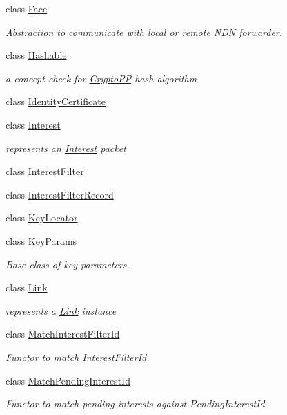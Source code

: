 \begin{DoxyCompactItemize}
class \hyperlink{classndn_1_1Face}{Face}
\begin{DoxyCompactList}\small\item\em Abstraction to communicate with local or remote N\+DN forwarder. \end{DoxyCompactList}\item 
class \hyperlink{classndn_1_1Hashable}{Hashable}
\begin{DoxyCompactList}\small\item\em a concept check for \hyperlink{namespaceCryptoPP}{Crypto\+PP} hash algorithm \end{DoxyCompactList}\item 
class \hyperlink{classndn_1_1IdentityCertificate}{Identity\+Certificate}
\item 
class \hyperlink{classndn_1_1Interest}{Interest}
\begin{DoxyCompactList}\small\item\em represents an \hyperlink{classndn_1_1Interest}{Interest} packet \end{DoxyCompactList}\item 
class \hyperlink{classndn_1_1InterestFilter}{Interest\+Filter}
\item 
class \hyperlink{classndn_1_1InterestFilterRecord}{Interest\+Filter\+Record}
\item 
class \hyperlink{classndn_1_1KeyLocator}{Key\+Locator}
\item 
class \hyperlink{classndn_1_1KeyParams}{Key\+Params}
\begin{DoxyCompactList}\small\item\em Base class of key parameters. \end{DoxyCompactList}\item 
class \hyperlink{classndn_1_1Link}{Link}
\begin{DoxyCompactList}\small\item\em represents a \hyperlink{classndn_1_1Link}{Link} instance \end{DoxyCompactList}\item 
class \hyperlink{classndn_1_1MatchInterestFilterId}{Match\+Interest\+Filter\+Id}
\begin{DoxyCompactList}\small\item\em Functor to match Interest\+Filter\+Id. \end{DoxyCompactList}\item 
class \hyperlink{classndn_1_1MatchPendingInterestId}{Match\+Pending\+Interest\+Id}
\begin{DoxyCompactList}\small\item\em Functor to match pending interests against Pending\+Interest\+Id. \end{DoxyCompactList}\item 

\end{DoxyCompactItemize}
